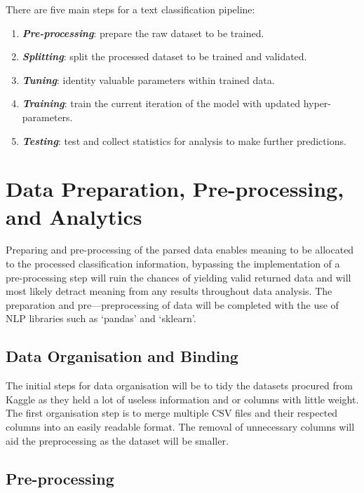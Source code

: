 There are five main steps for a text classification pipeline:

\begin{enumerate}
    \item \textbf{\textit{Pre-processing}}: prepare the raw dataset to be trained.
    \item \textbf{\textit{Splitting}}: split the processed dataset to be trained and validated.
    \item \textbf{\textit{Tuning}}: identity valuable parameters within trained data.
    \item \textbf{\textit{Training}}: train the current iteration of the model with updated hyper-parameters.
    \item \textbf{\textit{Testing}}: test and collect statistics for analysis to make further predictions.
\end{enumerate} \newpage

\section{Data Preparation, Pre-processing, and Analytics}

Preparing and pre-processing of the parsed data enables meaning to be allocated to the processed classification information, bypassing the implementation of a pre-processing step will ruin the chances of yielding valid returned data and will most likely detract meaning from any results throughout data analysis. The preparation and pre---preprocessing of data will be completed with the use of NLP libraries such as `pandas' and `sklearn'.

\subsection{Data Organisation and Binding}

The initial steps for data organisation will be to tidy the datasets procured from Kaggle as they held a lot of useless information and or columns with little weight. The first organisation step is to merge multiple CSV files and their respected columns into an easily readable format. The removal of unnecessary columns will aid the preprocessing as the dataset will be smaller.

\subsection{Pre-processing} \label{sub:C5Preprocessing}

